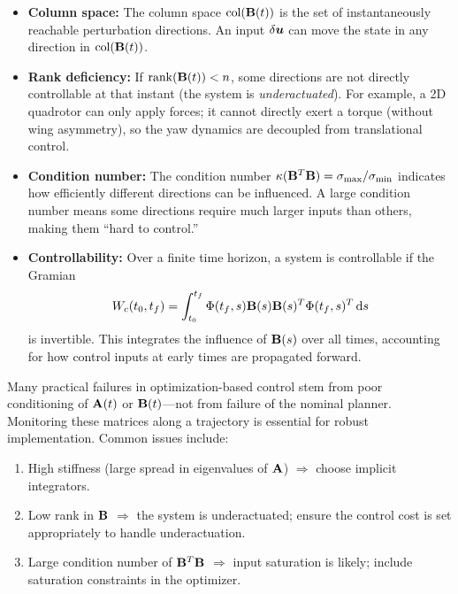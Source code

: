 \begin{itemize}
\item \textbf{Column space:} The column space $\text{col}(\mathbf{B}(t))$ is the set of instantaneously reachable
      perturbation directions. An input $\delta\bm{u}$ can move the state in any direction in $\text{col}(\mathbf{B}(t))$.

\item \textbf{Rank deficiency:} If $\operatorname{rank}(\mathbf{B}(t)) < n$, some directions are not directly controllable at
      that instant (the system is \emph{underactuated}). For example, a 2D quadrotor can only apply forces;
      it cannot directly exert a torque (without wing asymmetry), so the yaw dynamics are decoupled from
      translational control.

\item \textbf{Condition number:} The condition number $\kappa(\mathbf{B}^T\mathbf{B}) = \sigma_{\max}/\sigma_{\min}$
      indicates how efficiently different directions can be influenced. A large condition number means some
      directions require much larger inputs than others, making them ``hard to control.''

\item \textbf{Controllability:} Over a finite time horizon, a system is controllable if the Gramian
      \begin{equation}
      W_c(t_0, t_f) = \int_{t_0}^{t_f}\Phi(t_f, s)\mathbf{B}(s)\mathbf{B}(s)^T\Phi(t_f,s)^T\,\mathrm{d} s
      \label{eq:ch2:controllability-gramian}
      \end{equation}
      is invertible. This integrates the influence of $\mathbf{B}(s)$ over all times, accounting for how control
      inputs at early times are propagated forward.
\end{itemize}

\begin{warningbox}
Many practical failures in optimization-based control stem from poor conditioning of $\mathbf{A}(t)$ or
$\mathbf{B}(t)$---not from failure of the nominal planner. Monitoring these matrices along a trajectory is
essential for robust implementation. Common issues include:
\begin{enumerate}
\item High stiffness (large spread in eigenvalues of $\mathbf{A}$) $\Rightarrow$ choose implicit integrators.
\item Low rank in $\mathbf{B}$ $\Rightarrow$ the system is underactuated; ensure the control cost is set
      appropriately to handle underactuation.
\item Large condition number of $\mathbf{B}^T\mathbf{B}$ $\Rightarrow$ input saturation is likely; include
      saturation constraints in the optimizer.
\end{enumerate}
\end{warningbox}


